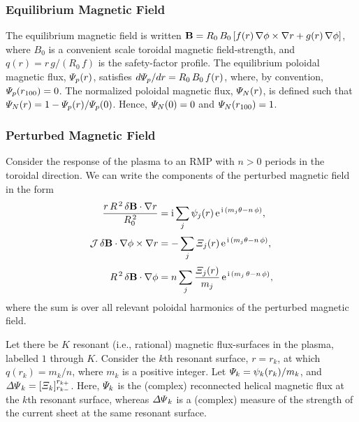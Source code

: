\documentclass[12pt,prb,aps]{revtex4-1}
\begin{document}
\subsubsection{Equilibrium Magnetic Field}\label{a2}
The equilibrium magnetic field is written
${\bf B} = R_0\,B_0\left[f(r)\,\nabla\phi\times \nabla r + g(r)\,\nabla\phi\right]$, 
where $B_0$ is a convenient scale toroidal magnetic field-strength, and
$q(r) = r\,g/(R_0\,f)$
is the safety-factor profile. The equilibrium poloidal magnetic flux, ${\mit\Psi}_p(r)$,
satisfies $d{\mit\Psi}_p/dr = R_0\,B_0\,f(r)$, where, by convention, ${\mit\Psi}_p(r_{100})=0$. The
normalized poloidal magnetic flux, ${\mit\Psi}_N(r)$, is defined such that
${\mit\Psi}_N(r) = 1-{\mit\Psi}_p(r)/{\mit\Psi}_p(0)$. Hence, ${\mit\Psi}_N(0)=0$ and
${\mit\Psi}_N(r_{100})=1$. 

\subsubsection{Perturbed Magnetic Field}
Consider the response of the plasma to an RMP with $n>0$ periods in the toroidal direction.
We can write the components of the perturbed magnetic field in the form
\begin{align}
\frac{r\,R^{\,2}\,\delta{\bf B}\cdot\nabla r}{R_0^{\,2}}&= {\rm i}\sum_j \psi_j(r)\,{\rm e}^{\,{\rm i}\,(m_j\theta-n\,\phi)},\\[0.5ex]
{\cal J} \,\delta{\bf B}\cdot\nabla\phi\times \nabla r &= -\sum_j{\mit\Xi}_j(r)\,{\rm e}^{\,{\rm i}\,(m_j\theta-n\,\phi)},\\[0.5ex]
R^{\,2}\,\delta{\bf B}\cdot\nabla\phi&= n\sum_j \frac{{\mit\Xi}_j(r)}{m_j}\,{\rm e}^{\,{\rm i}\,(m_j\,\theta-n\,\phi)},
\end{align}
where the sum is over all relevant poloidal harmonics of the perturbed magnetic field. 

Let there be $K$ resonant (i.e., rational) magnetic flux-surfaces in the plasma, labelled $1$ through $K$.
Consider the $k$th resonant surface, $r=r_k$, at which $q(r_k)= m_k/n$, where $m_k$ is a positive integer. Let
${\mit\Psi}_k = \psi_k(r_k)/m_k$, and 
${\mit\Delta\Psi}_k=[{\mit\Xi}_k]_{r_{k-}}^{r_{k+}}$.
Here, ${\mit\Psi}_k$ is the (complex) reconnected helical magnetic flux at the $k$th resonant surface, whereas ${\mit\Delta\Psi}_k$  is a (complex) 
measure of the strength of the current sheet  at the same resonant surface. 
\end{document}
